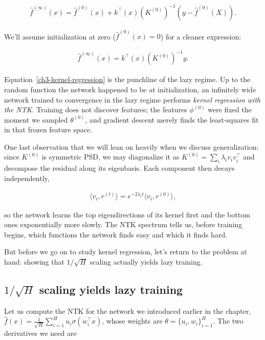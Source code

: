 \begin{align}
{\hat{f}}^{(\infty)}(x) =\hat{f}^{(0)}(x)+ k^\top(x)(K^{(0)})^{-1}(y-\hat{f}^{(0)}(X)).
\end{align}

We'll assume initialization at zero ($\hat{f}^{(0)}(x)=0$) for a cleaner expression:

\begin{align}
    {\hat{f}}^{(\infty)}(x) =  k^\top(x)(K^{(0)})^{-1}y.
    \label{ch3-kernel-regression-clean}
\end{align}

Equation~\eqref{ch3-kernel-regression} is the punchline of the lazy regime. Up to the
random function the network happened to be at initialization, an infinitely wide network
trained to convergence in the lazy regime performs \textit{kernel regression with the NTK}.
Training does not discover features; the features $\phi^{(0)}$ were fixed the moment we
sampled $\theta^{(0)}$, and gradient descent merely finds the least-squares fit in that
frozen feature space.

One last observation that we will lean on heavily when we discuss generalization: since
$K^{(0)}$ is symmetric PSD, we may diagonalize it as $K^{(0)} = \sum_i \lambda_i v_i v_i^\top$
and decompose the residual along its eigenbasis. Each component then decays independently,

\begin{align}
\langle v_i, r^{(t)}\rangle = e^{-2\lambda_i t}\langle v_i, r^{(0)}\rangle,
\end{align}

so the network learns the top eigendirections of its kernel first and the bottom ones
exponentially more slowly. The NTK spectrum tells us, before training begins, which
functions the network finds easy and which it finds hard.


 But before we go on to study kernel regression, let's return
to the problem at hand: showing that $1/\sqrt{H}$ scaling actually yields lazy training.

\subsection{$1/\sqrt{H}$ scaling yields lazy training}

Let us compute the NTK for the network we introduced earlier in the chapter,
$\hat{f}(x) = \frac{1}{\sqrt{H}}\sum^H_{i=1}u_i \sigma(w^\top_i x)$, whose weights are
$\theta = \{u_i, w_i\}^H_{i=1}$. The two derivatives we need are

